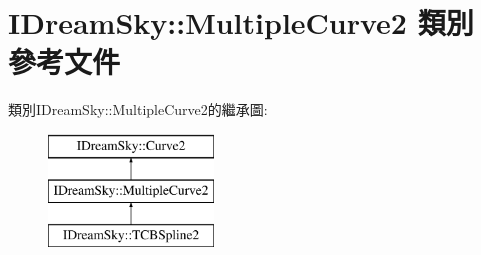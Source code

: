 \hypertarget{class_i_dream_sky_1_1_multiple_curve2}{}\section{I\+Dream\+Sky\+:\+:Multiple\+Curve2 類別 參考文件}
\label{class_i_dream_sky_1_1_multiple_curve2}
類別\+I\+Dream\+Sky\+:\+:Multiple\+Curve2的繼承圖\+:\begin{figure}[H]
\begin{center}
\leavevmode
\includegraphics[height=3.000000cm]{class_i_dream_sky_1_1_multiple_curve2}
\end{center}
\end{figure}
